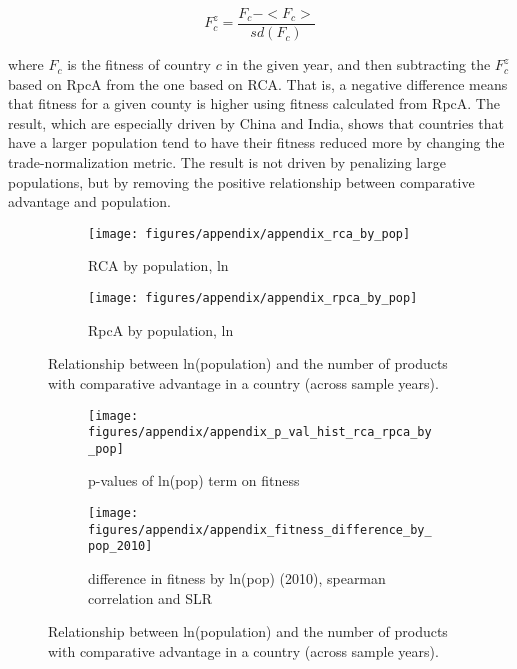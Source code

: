 \documentclass[11pt]{article}
\begin{document}
\begin{appendices}
\[
 F^{z}_{c} = \frac{F_{c} - <F_{c}>}{sd(F_{c})}
\]

where \(F_{c}\) is the fitness of country \(c\) in the given year, and then subtracting the \(F^{z}_{c}\) based on RpcA from the one based on RCA. That is, a negative difference means that fitness for a given county is higher using fitness calculated from RpcA. The result, which are especially driven by China and India, shows that countries that have a larger population tend to have their fitness reduced more by changing the trade-normalization metric. The result is not driven by penalizing large populations, but by removing the positive relationship between comparative advantage and population.

\begin{figure}
     \centering
     \begin{subfigure}[b]{0.45\textwidth}
         \centering
         \texttt{[image: figures/appendix/appendix\_rca\_by\_pop]}
         \caption{RCA by population, ln}
         \label{fig:rca_by_pop}
     \end{subfigure}
     \hfill
     \begin{subfigure}[b]{0.45\textwidth}
         \centering
         \texttt{[image: figures/appendix/appendix\_rpca\_by\_pop]}
         \caption{RpcA by population, ln}
         \label{fig:rpca_by_pop}
     \end{subfigure}
	 \caption{Relationship between ln(population) and the number of products
	   with comparative advantage in a country (across sample years).}
        \label{fig:rca_rpca_by_pop}
\end{figure}

\begin{figure}
     \centering
     \begin{subfigure}[b]{0.45\textwidth}
         \centering
         \texttt{[image: figures/appendix/appendix\_p\_val\_hist\_rca\_rpca\_by\_pop]}
         \caption{p-values of ln(pop) term on fitness}
         \label{fig:p_val_hist_pop}
     \end{subfigure}
     \hfill
     \begin{subfigure}[b]{0.45\textwidth}
       \centering
         \texttt{[image: figures/appendix/appendix\_fitness\_difference\_by\_pop\_2010]}
         \caption{difference in fitness by ln(pop) (2010), spearman correlation and SLR}
         \label{fig:stand_diff_fit_pop}
     \end{subfigure}
	 \caption{Relationship between ln(population) and the number of products with comparative advantage in a country (across sample years).}
        \label{fig:population_difference}
\end{figure}


\end{appendices}
\end{document}
